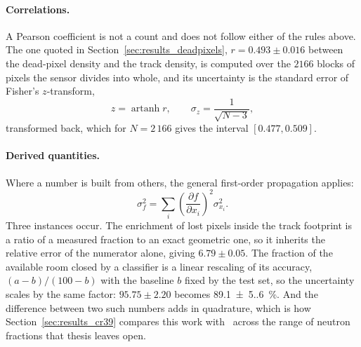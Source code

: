 \documentclass[a4paper,headsepline,oneside,11pt]{scrartcl}
\begin{document}
\paragraph{Correlations.} A Pearson coefficient is not a count and does not
follow either of the rules above. The one quoted in
Section~\ref{sec:results_deadpixels}, $r = 0.493 \pm 0.016$ between the
dead-pixel density and the track density, is computed over the $2166$ blocks
of  pixels the sensor divides into whole, and its uncertainty is the
standard error of Fisher's $z$-transform,
%
\begin{equation}
  z = \operatorname{artanh} r, \qquad \sigma_z = \frac{1}{\sqrt{N-3}},
  \label{eq:fisher}
\end{equation}
%
transformed back, which for $N = 2\,166$ gives the interval $[0.477, 0.509]$.

\paragraph{Derived quantities.} Where a number is built from others, the general
first-order propagation applies:
%
\begin{equation}
  \sigma_f^2 = \sum_i \left( \frac{\partial f}{\partial x_i} \right)^{\!2}
               \sigma_{x_i}^2 .
  \label{eq:propagation}
\end{equation}
%
Three instances occur. The enrichment of lost pixels inside the track footprint
is a ratio of a measured fraction to an exact geometric one, so it inherits the
relative error of the numerator alone, giving $6.79 \pm 0.05$. The fraction of
the available room closed by a classifier is a linear rescaling of its accuracy,
$(a - b)/(100 - b)$ with the baseline $b$ fixed by the test set, so the
uncertainty scales by the same factor: $95.75 \pm 2.20$ becomes
\SI{89.1(5.6)}{\percent}. And the difference between two such numbers adds in
quadrature, which is how Section~\ref{sec:results_cr39} compares this work
with~\cite{Filter2018} across the range of neutron fractions that thesis leaves
open.
\end{document}
